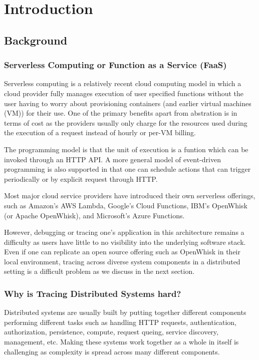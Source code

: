 \chapter{Introduction}

\section{Background}

\subsection{Serverless Computing or Function as a Service (FaaS)}
Serverless computing is a relatively recent cloud computing model in which a cloud provider fully manages execution of user specified functions without the user having to worry about provisioning containers (and earlier virtual machines (VM)) for their use. One of the primary benefits apart from abstration is in terms of cost as the providers usually only charge for the resources used during the execution of a request instead of hourly or per-VM billing.

The programming model is that the unit of execution is a funtion which can be invoked through an HTTP API. A more general model of event-driven programming is also supported in that one can schedule actions that can trigger periodically or by explicit request through HTTP.

Most major cloud service providers have introduced their own serverless offerings, such as Amazon's AWS Lambda, Google's Cloud Functions, IBM's OpenWhisk (or Apache OpenWhisk\cite{web:wsk}), and Microsoft's Azure Functions.

However, debugging or tracing one's application in this architecture remains a difficulty as users have little to no visibility into the underlying software stack. Even if one can replicate an open source offering such as OpenWhisk in their local environment, tracing across diverse system components in a distributed setting is a difficult problem as we discuss in the next section.

\subsection{Why is Tracing Distributed Systems hard?}\label{sec:challenge}
Distributed systems are usually built by putting together different components performing different tasks such as handling HTTP requests, authentication, authorization, persistence, compute, request queing, service discovery, management, etc. Making these systems work together as a whole in itself is challenging as complexity is spread across many different components.


